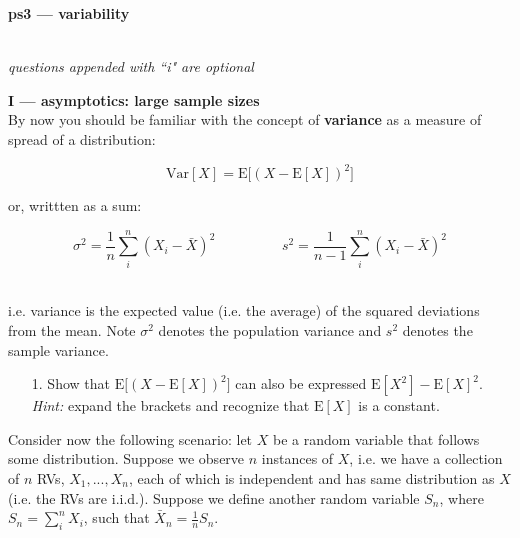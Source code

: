\documentclass[10pt]{extarticle}
\newcommand{\E}{\text{E}}
\newcommand{\Var}{\text{Var}}
\begin{document}
\setlength{\parindent}{0pt}





{\bf \huge ps3 --- variability}

\hrulefill \\

{\it questions appended with ``i" are optional} \\

\hfill





{\Large \bf I --- asymptotics: large sample sizes}  \\

By now you should be familiar with the concept of {\bf variance} as a measure of spread of a distribution:

$$\Var[X] = \E \big[ (X - \E[X] )^2 \big]$$  

or, writtten as a sum:

$$\sigma^2 = \frac 1n \sum_i^n (X_i - \bar X)^2 \hspace{2cm} s^2 = \frac{1}{n-1} \sum_i^n (X_i - \bar X)^2$$ \ 

i.e. variance is the expected value (i.e. the average) of the squared deviations from the mean. Note $\sigma^2$ denotes the population variance and $s^2$ denotes the sample variance. 

\hfill 

\begin{itemize}

	\item[1.] Show that $\E \big[ (X - \E[X] )^2 \big]$ can also be expressed $\E[X^2] - \E[X]^2$. {\it Hint:} expand the brackets and recognize that $\E[X]$ is a constant.  

\end{itemize} 

\hfill 

Consider now the following scenario: let $X$ be a random variable that follows some distribution. Suppose we observe $n$ instances of $X$, i.e. we have a collection of $n$ RVs, $X_1, ..., X_n$, each of which is independent and has same distribution as $X$ (i.e. the RVs are i.i.d.). Suppose we define another random variable $S_n$, where $S_n = \sum_i^n X_i$, such that $\bar X_n = \frac 1n S_n$.  

\hfill 
\end{document}
